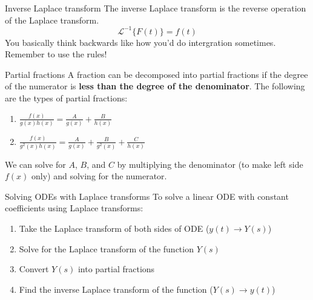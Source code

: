 \documentclass{article}
\begin{document}
\begin{definition}
    {Inverse Laplace transform}
    The inverse Laplace transform is the reverse operation of the Laplace transform.
    \[\mathcal{L}^{-1}\{F(t)\}=f(t)\]
    You basically think backwards like how you'd do intergration sometimes. Remember to use the rules!
\end{definition}

\begin{knBox}
    {Partial fractions}
    A fraction can be decomposed into partial fractions if the degree of the numerator is \textbf{less than the degree of the denominator}. The following are the types of partial fractions:
    \begin{enumerate}
        \item $\frac{f(x)}{g(x)h(x)} = \frac{A}{g(x)} + \frac{B}{h(x)}$
        \item $\frac{f(x)}{g^2(x)h(x)} = \frac{A}{g(x)} + \frac{B}{g^2(x)} + \frac{C}{h(x)}$
    \end{enumerate}
    We can solve for $A$, $B$, and $C$ by multiplying the denominator (to make left side $f(x)$ only) and solving for the numerator.
\end{knBox}

\begin{definition}
    {Solving ODEs with Laplace transforms}
    To solve a linear ODE with constant coefficients using Laplace transforms:
    \begin{enumerate}
        \item Take the Laplace transform of both sides of ODE ($y(t) \to Y(s)$)
        \item Solve for the Laplace transform of the function $Y(s)$
        \item Convert $Y(s)$ into partial fractions
        \item Find the inverse Laplace transform of the function ($Y(s)\to y(t)$)
    \end{enumerate}
\end{definition}
\end{document}
